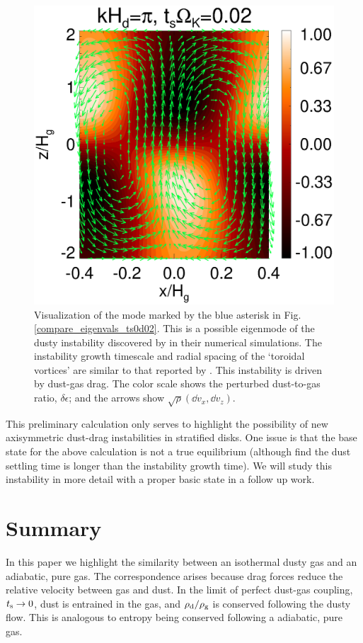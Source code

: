 \begin{figure}
  \includegraphics[width=\linewidth]{figures/result2d_loren.ps}
  \caption{Visualization of the mode marked by the blue asterisk in
    Fig. \protect\ref{compare_eigenvals_ts0d02}. 
    This is a possible eigenmode of the dusty instability discovered by  
    \cite{loren15} in their numerical simulations. The instability growth timescale and 
    radial spacing of the `toroidal vortices' are similar to that 
    reported by \citeauthor{loren15}. This instability is driven by
    dust-gas drag. The color scale shows the 
    perturbed  
    dust-to-gas ratio, $\delta\epsilon$; and the arrows show
    $\sqrt{\rho}\left(\dd v_x, \dd v_z\right)$. 
  }\label{result2d_loren}
\end{figure}





This preliminary calculation only serves to highlight the possibility
of new axisymmetric dust-drag instabilities in stratified disks. One 
issue is that the base state for the above calculation is not a true
equilibrium (although \citeauthor {loren15} find the dust settling
time is longer than the instability growth time). We will study
this instability in more detail with a proper basic
state in a follow up work.  

\section{Summary}\label{summary}
In this paper we highlight the similarity between an isothermal 
dusty gas and an adiabatic, pure gas. The correspondence arises
because drag forces reduce the relative velocity between gas and
dust. In the limit of perfect dust-gas coupling, $t_\mathrm{s} \to 0$,  
 dust is entrained in 
the gas, and $\rho_\mathrm{d}/\rho_\mathrm{g}$ is conserved following the dusty flow. 
This is analogous to entropy being conserved following a adiabatic,
pure gas. 

